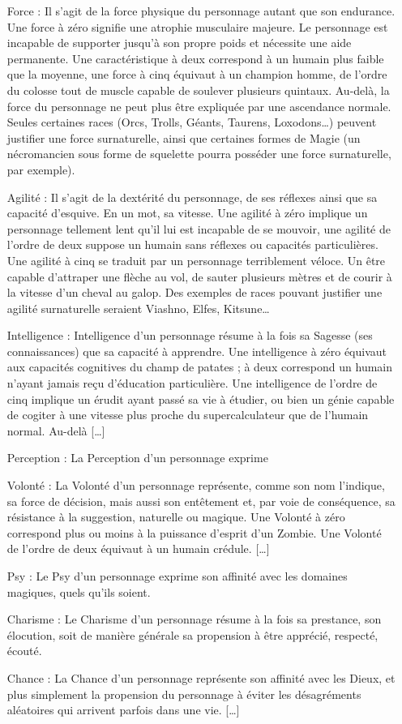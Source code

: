 \begin{itemize}
    \item[Force :] Il s’agit de la force physique du personnage autant que son endurance. Une force à zéro signifie une atrophie musculaire majeure. Le personnage est incapable de supporter jusqu’à son propre poids et nécessite une aide permanente. Une caractéristique à deux correspond à un humain plus faible que la moyenne, une force à cinq équivaut à un champion homme, de l’ordre du colosse tout de muscle capable de soulever plusieurs quintaux. Au-delà, la force du personnage ne peut plus être expliquée par une ascendance normale. Seules certaines races (Orcs, Trolls, Géants, Taurens, Loxodons…) peuvent justifier une force surnaturelle, ainsi que certaines formes de Magie (un nécromancien sous forme de squelette pourra posséder une force surnaturelle, par exemple).
    \item[Agilité :] Il s’agit de la dextérité du personnage, de ses réflexes ainsi que sa capacité d’esquive. En un mot, sa vitesse. Une agilité à zéro implique un personnage tellement lent qu’il lui est incapable de se mouvoir, une agilité de l’ordre de deux suppose un humain sans réflexes ou capacités particulières. Une agilité à cinq se traduit par un personnage terriblement véloce. Un être capable d’attraper une flèche au vol, de sauter plusieurs mètres et de courir à la vitesse d’un cheval au galop. Des exemples de races pouvant justifier une agilité surnaturelle seraient Viashno, Elfes, Kitsune…
    \item[Intelligence :] Intelligence d’un personnage résume à la fois sa Sagesse (ses connaissances) que sa capacité à apprendre. Une intelligence à zéro équivaut aux capacités cognitives du champ de patates ; à deux correspond un humain n’ayant jamais reçu d’éducation particulière. Une intelligence de l’ordre de cinq implique un érudit ayant passé sa vie à étudier, ou bien un génie capable de cogiter à une vitesse plus proche du supercalculateur que de l’humain normal. Au-delà […]
    \item[Perception :] La Perception d’un personnage exprime 
    \item[Volonté :] La Volonté d’un personnage représente, comme son nom l’indique, sa force de décision, mais aussi son entêtement et, par voie de conséquence, sa résistance à la suggestion, naturelle ou magique. Une Volonté à zéro correspond plus ou moins à la puissance d’esprit d’un Zombie. Une Volonté de l’ordre de deux équivaut à un humain crédule. […]
    \item[Psy :] Le Psy d’un personnage exprime son affinité avec les domaines magiques, quels qu’ils soient. 
    \item[Charisme :] Le Charisme d’un personnage résume à la fois sa prestance, son élocution, soit de manière générale sa propension à être apprécié, respecté, écouté. 
    \item[Chance :] La Chance d’un personnage représente son affinité avec les Dieux, et plus simplement la propension du personnage à éviter les désagréments aléatoires qui arrivent parfois dans une vie. […]
\end{itemize}
